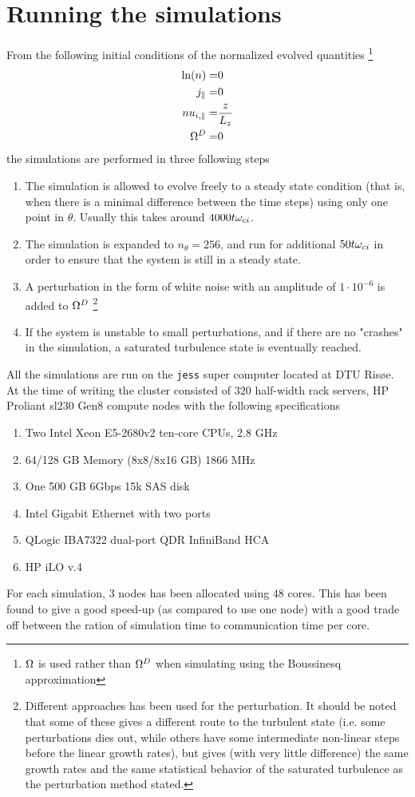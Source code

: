 \section{Running the simulations}
\label{sec:initRun}
%
From the following initial conditions of the normalized evolved quantities%
%
\footnote{$\Omega$ is used rather than $\Omega^D$ when simulating using the Boussinesq approximation}%
%
\begin{align*}
    \ln(n)    =& 0\\
    j_\|      =& 0\\
    nu_{i,\|} =& \frac{z}{L_z}\\
    \Omega^D     =& 0
\end{align*}
%
the simulations are performed in three following steps
%
\begin{enumerate}[noitemsep]
    \item The simulation is allowed to evolve freely to a steady state condition (that is, when there is a minimal difference between the time steps) using only one point in $\theta$.
        Usually this takes around $4000t\omega_{ci}$.
    \item The simulation is expanded to $n_\theta = 256$, and run for additional $50t\omega_{ci}$ in order to ensure that the system is still in a steady state.
    \item A perturbation in the form of white noise with an amplitude of $1\cdot10^{-6}$ is added to $\Omega^D$%
        \footnote{Different approaches has been used for the perturbation.
            It should be noted that some of these gives a different route to the turbulent state (i.e. some perturbations dies out, while others have some intermediate non-linear steps before the linear growth rates), but gives (with very little difference) the same growth rates and the same statistical behavior of the saturated turbulence as the perturbation method stated.}%
    \item If the system is unstable to small perturbations, and if there are no "crashes" in the simulation, a saturated turbulence state is eventually reached.
\end{enumerate}
%
All the simulations are run on the \texttt{jess} super computer located at DTU Ris{\o}e.
At the time of writing the cluster consisted of $320$ half-width rack servers, HP Proliant sl230 Gen8 compute nodes with the following specifications
%
\begin{enumerate}[noitemsep]
    \item Two Intel Xeon E5-2680v2 ten-core CPUs, 2.8 GHz
    \item 64/128 GB Memory (8x8/8x16 GB) 1866 MHz
    \item One 500 GB 6Gbps 15k SAS disk
    \item Intel Gigabit Ethernet with two ports
    \item QLogic IBA7322 dual-port QDR InfiniBand HCA
    \item HP iLO v.4
\end{enumerate}
%
For each simulation, $3$ nodes has been allocated using $48$ cores.
This has been found to give a good speed-up (as compared to use one node) with a good trade off between the ration of simulation time to communication time per core.

